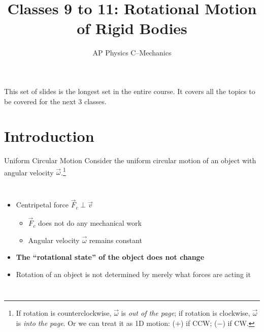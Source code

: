 \documentclass[12pt,compress,aspectratio=169]{beamer}
\title{Classes 9 to 11: Rotational Motion of Rigid Bodies}
\subtitle{AP Physics C--Mechanics}
\begin{document}
\begin{frame}
  \maketitle
\end{frame}


\begin{frame}{}
  This set of slides is the longest set in the entire course. It covers all the
  topics to be covered for the next 3 classes.
\end{frame}




\section{Introduction}

\begin{frame}{Uniform Circular Motion}
  Consider the uniform circular motion of an object with angular velocity
  $\vec\omega$.\footnote{If rotation is counterclockwise, $\vec\omega$ is
  \emph{out of the page}; if rotation is clockwise, $\vec\omega$ is
  \emph{into the page}. Or we can treat it as 1D motion: ($+$) if CCW; ($-$) if
  CW.}
  \begin{columns}
    \centering

    \begin{itemize}
    \item Centripetal force $\vec F_c\perp\vec v$
      \begin{itemize}
      \item $\vec F_c$ does not do any mechanical work
      \item Angular velocity $\vec\omega$ remains constant
      \end{itemize}
    \item\textbf{The ``rotational state'' of the object does not change}
    \item Rotation of an object is not determined by merely what forces are
      acting it
    \end{itemize}
  \end{columns}
  \vspace{.3in}
\end{frame}
\end{document}
